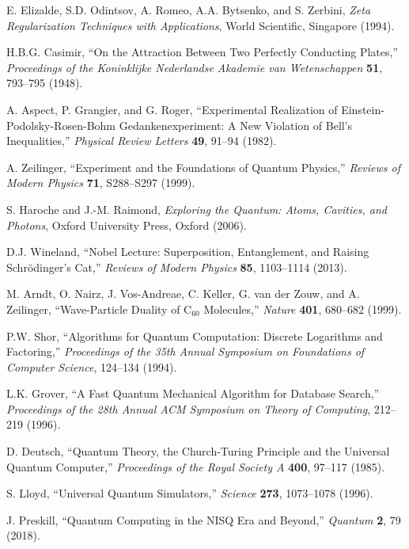 \documentclass[11pt]{article}
\theoremstyle{plain}
\theoremstyle{definition}
\theoremstyle{remark}
\begin{document}
\begin{thebibliography}{99}
 E. Elizalde, S.D. Odintsov, A. Romeo, A.A. Bytsenko, and S. Zerbini, \emph{Zeta Regularization Techniques with Applications}, World Scientific, Singapore (1994).

 H.B.G. Casimir, ``On the Attraction Between Two Perfectly Conducting Plates,'' \emph{Proceedings of the Koninklijke Nederlandse Akademie van Wetenschappen} \textbf{51}, 793--795 (1948).

 A. Aspect, P. Grangier, and G. Roger, ``Experimental Realization of Einstein-Podolsky-Rosen-Bohm Gedankenexperiment: A New Violation of Bell's Inequalities,'' \emph{Physical Review Letters} \textbf{49}, 91--94 (1982).

 A. Zeilinger, ``Experiment and the Foundations of Quantum Physics,'' \emph{Reviews of Modern Physics} \textbf{71}, S288--S297 (1999).

 S. Haroche and J.-M. Raimond, \emph{Exploring the Quantum: Atoms, Cavities, and Photons}, Oxford University Press, Oxford (2006).

 D.J. Wineland, ``Nobel Lecture: Superposition, Entanglement, and Raising Schrödinger's Cat,'' \emph{Reviews of Modern Physics} \textbf{85}, 1103--1114 (2013).

 M. Arndt, O. Nairz, J. Vos-Andreae, C. Keller, G. van der Zouw, and A. Zeilinger, ``Wave-Particle Duality of C$_{60}$ Molecules,'' \emph{Nature} \textbf{401}, 680--682 (1999).

 P.W. Shor, ``Algorithms for Quantum Computation: Discrete Logarithms and Factoring,'' \emph{Proceedings of the 35th Annual Symposium on Foundations of Computer Science}, 124--134 (1994).

 L.K. Grover, ``A Fast Quantum Mechanical Algorithm for Database Search,'' \emph{Proceedings of the 28th Annual ACM Symposium on Theory of Computing}, 212--219 (1996).

 D. Deutsch, ``Quantum Theory, the Church-Turing Principle and the Universal Quantum Computer,'' \emph{Proceedings of the Royal Society A} \textbf{400}, 97--117 (1985).

 S. Lloyd, ``Universal Quantum Simulators,'' \emph{Science} \textbf{273}, 1073--1078 (1996).

 J. Preskill, ``Quantum Computing in the NISQ Era and Beyond,'' \emph{Quantum} \textbf{2}, 79 (2018).


\end{thebibliography}
\end{document}
